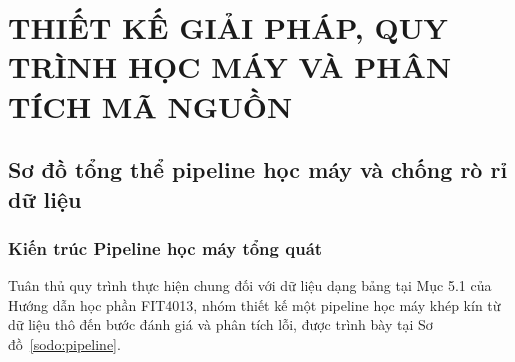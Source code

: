 \chapter[THIẾT KẾ GIẢI PHÁP, QUY TRÌNH HỌC MÁY VÀ PHÂN TÍCH MÃ NGUỒN]{THIẾT KẾ GIẢI PHÁP, QUY TRÌNH HỌC MÁY VÀ PHÂN TÍCH MÃ NGUỒN}

\section{Sơ đồ tổng thể pipeline học máy và chống rò rỉ dữ liệu}

\subsection{Kiến trúc Pipeline học máy tổng quát}
Tuân thủ quy trình thực hiện chung đối với dữ liệu dạng bảng tại Mục 5.1 của Hướng dẫn học phần FIT4013, nhóm thiết kế một pipeline học máy khép kín từ dữ liệu thô đến bước đánh giá và phân tích lỗi, được trình bày tại Sơ đồ~\ref{sodo:pipeline}.

